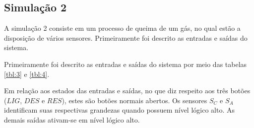 \subsection{Simulação 2}

A simulação 2 consiste em um processo de queima de um gás, no qual estão a disposição de vários sensores. Primeiramente foi descrito as entradas e saídas do sistema.

Primeiramente foi descrito as entradas e saídas do sistema por meio das tabelas \ref{tbl:3} e \ref{tbl:4}.



Em relação aos estados das entradas e saídas, no que diz respeito aos três botões ($LIG$, $DES$ e $RES$), estes são botões normais abertos. Os sensores $S_C$ e $S_A$ identificam suas respectivas grandezas quando possuem nível lógico alto. As demais saídas ativam-se em nível lógico alto.


